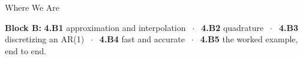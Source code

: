 

\graphicspath{{./figures/}}





\makedecktitle

\begin{frame}{Where We Are}
\vspace{-1mm}
\begin{center}
\small \textbf{Block B:} \textbf{4.B1} approximation and interpolation $\;\cdot\;$ \textbf{4.B2} quadrature $\;\cdot\;$ \textbf{4.B3} discretizing an AR(1) $\;\cdot\;$ \textbf{4.B4} fast and accurate $\;\cdot\;$ \textbf{4.B5} the worked example, end to end.
\end{center}
\end{frame}

